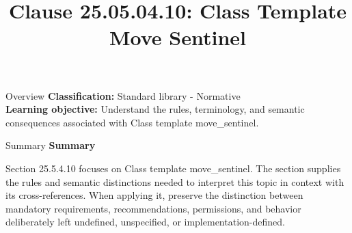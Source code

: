 \documentclass[10pt,letterpaper]{article}
\title{Clause 25.05.04.10: Class Template Move Sentinel}
\author{}
\date{}
\begin{document}
\maketitle
\begin{CornellOverviewBox}{Overview}
\textbf{Classification:} Standard library - Normative\\[2pt]
\textbf{Learning objective:} Understand the rules, terminology, and semantic consequences associated with Class template move\_sentinel.
\end{CornellOverviewBox}\begin{CornellSummaryBox}{Summary}
{\sffamily\bfseries\color{Accent} Summary}\par\vspace{3pt}Section 25.5.4.10 focuses on Class template move\_sentinel. The section supplies the rules and semantic distinctions needed to interpret this topic in context with its cross-references. When applying it, preserve the distinction between mandatory requirements, recommendations, permissions, and behavior deliberately left undefined, unspecified, or implementation-defined.
\end{CornellSummaryBox}
\end{document}
